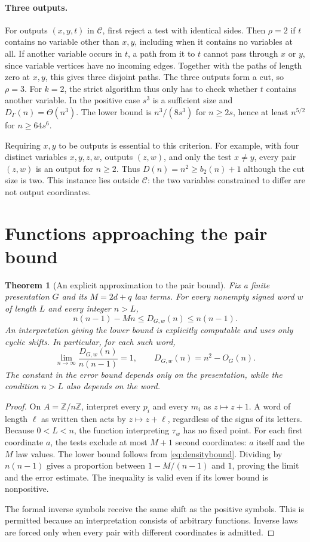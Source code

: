 \documentclass[12pt]{article}
\newtheorem{theorem}{Theorem}[section]
\theoremstyle{definition}
\begin{document}
\paragraph{Three outputs.}
For outputs $(x,y,t)$ in $\mathcal C$, first reject a test with identical
sides. Then $\rho=2$ if $t$ contains no variable other than $x,y$,
including when it contains no variables at all. If another variable
occurs in $t$, a path from it to $t$ cannot pass through $x$ or $y$,
since variable vertices have no incoming edges. Together with the
paths of length zero at $x,y$, this gives three disjoint paths.
The three outputs form a cut, so $\rho=3$.
For $k=2$, the strict algorithm thus only has to check whether $t$
contains another variable. In the positive case $s^3$ is a sufficient
size and $D_\Gamma(n)=\Theta(n^3)$. The lower bound is
$n^3/(8s^3)$ for $n\ge2s$, hence at least $n^{5/2}$ for $n\ge64s^6$.

Requiring $x,y$ to be outputs is essential to this criterion.
For example, with four distinct variables $x,y,z,w$, outputs $(z,w)$,
and only the test $x\ne y$, every pair $(z,w)$ is an output for
$n\ge2$. Thus $D(n)=n^2\ge b_2(n)+1$ although the cut size is two.
This instance lies outside $\mathcal C$: the two variables constrained
to differ are not output coordinates.

\section{Functions approaching the pair bound}\label{sec:near}

\begin{theorem}[An explicit approximation to the pair bound]\label{thm:near}
Fix a finite presentation $G$ and its $M=2d+q$ law terms.
For every nonempty signed word $w$ of length $L$ and every integer $n>L$,
\[
 n(n-1)-Mn\le D_{G,w}(n)\le n(n-1).
\]
An interpretation giving the lower bound is explicitly computable and
uses only cyclic shifts. In particular, for each such word,
\[
 \lim_{n\to\infty}\frac{D_{G,w}(n)}{n(n-1)}=1,
 \qquad D_{G,w}(n)=n^2-O_G(n).
\]
The constant in the error bound depends only on the presentation,
while the condition $n>L$ also depends on the word.
\end{theorem}
\begin{proof}
On $A=\mathbb Z/n\mathbb Z$, interpret every $p_i$ and every $m_i$ as
$z\mapsto z+1$. A word of length $\ell$ as written then acts by
$z\mapsto z+\ell$, regardless of the signs of its letters.
Because $0<L<n$, the function interpreting $\tau_w$ has no fixed point.
For each first coordinate $a$, the tests exclude at most $M+1$ second
coordinates: $a$ itself and the $M$ law values. The lower bound follows
from \eqref{eq:densitybound}. Dividing by $n(n-1)$ gives a proportion
between $1-M/(n-1)$ and $1$, proving the limit and the error estimate.
The inequality is valid even if its lower bound is nonpositive.

The formal inverse symbols receive the same shift as the positive
symbols. This is permitted because an interpretation consists of
arbitrary functions. Inverse laws are forced only when every pair with
different coordinates is admitted.
\end{proof}
\end{document}

